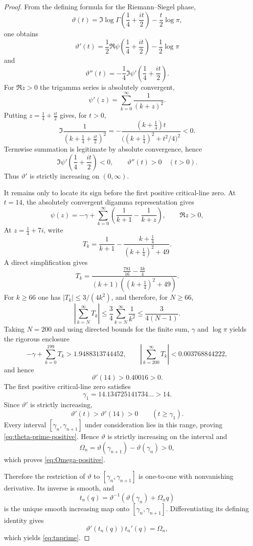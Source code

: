 \documentclass[11pt]{amsart}
\numberwithin{equation}{section}
\begin{document}
\begin{proof}
From the defining formula for the Riemann--Siegel phase,
\[
\vartheta(t)
=\Im\log\Gamma\!\left(\frac14+\frac{it}{2}\right)
-\frac t2\log\pi,
\]
one obtains
\begin{equation}
\vartheta'(t)
=\frac12\Re\psi\!\left(\frac14+\frac{it}{2}\right)
-\frac12\log\pi
\label{eq:theta-digamma}
\end{equation}
and
\begin{equation}
\vartheta''(t)
=-\frac14\Im\psi'\!\left(\frac14+\frac{it}{2}\right).
\label{eq:theta-trigamma}
\end{equation}
For $\Re z>0$ the trigamma series is absolutely convergent,
\[
\psi'(z)=\sum_{k=0}^{\infty}\frac1{(k+z)^2}.
\]
Putting $z=\frac14+\frac{it}{2}$ gives, for $t>0$,
\[
\Im\frac1{(k+\frac14+\frac{it}{2})^2}
=
-\frac{(k+\frac14)t}
{\bigl((k+\frac14)^2+t^2/4\bigr)^2}<0.
\]
Termwise summation is legitimate by absolute convergence, hence
\[
\Im\psi'\!\left(\frac14+\frac{it}{2}\right)<0,
\qquad
\boxed{\vartheta''(t)>0\quad(t>0).}
\]
Thus $\vartheta'$ is strictly increasing on $(0,\infty)$.

It remains only to locate its sign before the first positive critical-line zero.  At $t=14$, the absolutely convergent digamma representation gives
\[
\psi(z)=-\gamma+\sum_{k=0}^{\infty}
\left(\frac1{k+1}-\frac1{k+z}\right),
\qquad \Re z>0,
\]
At $z=\frac14+7i$, write
\[
T_k=\frac1{k+1}-\frac{k+\frac14}{(k+\frac14)^2+49}.
\]
A direct simplification gives
\[
T_k=
\frac{\frac{781}{16}-\frac{3k}{4}}
{(k+1)((k+\frac14)^2+49)}.
\]
For $k\ge66$ one has $|T_k|\le3/(4k^2)$, and therefore, for
$N\ge66$,
\[
\left|\sum_{k=N}^{\infty}T_k\right|
\le\frac34\sum_{k=N}^{\infty}\frac1{k^2}
\le\frac{3}{4(N-1)}.
\]
Taking $N=200$ and using directed bounds for the finite sum, $\gamma$
and $\log\pi$ yields the rigorous enclosure
\[
-\gamma+\sum_{k=0}^{199}T_k>1.9488313744452,
\qquad
\left|\sum_{k=200}^{\infty}T_k\right|<0.003768844222,
\]
and hence
\[
\boxed{\vartheta'(14)>0.40016>0.}
\]
The first positive critical-line zero satisfies
\[
\gamma_1=14.134725141734\ldots>14.
\]
Since $\vartheta'$ is strictly increasing,
\[
\vartheta'(t)>\vartheta'(14)>0
\qquad(t\ge\gamma_1).
\]
Every interval $[\gamma_n,\gamma_{n+1}]$ under consideration lies in this range, proving \eqref{eq:theta-prime-positive}.  Hence $\vartheta$ is strictly increasing on the interval and
\[
\Omega_n
=\vartheta(\gamma_{n+1})-\vartheta(\gamma_n)>0,
\]
which proves \eqref{eq:Omega-positive}.

Therefore the restriction of $\vartheta$ to $[\gamma_n,\gamma_{n+1}]$ is one-to-one with nonvanishing derivative.  Its inverse is smooth, and
\[
t_n(q)
=\vartheta^{-1}\!\left(\vartheta(\gamma_n)+\Omega_nq\right)
\]
is the unique smooth increasing map onto $[\gamma_n,\gamma_{n+1}]$.  Differentiating its defining identity gives
\[
\vartheta'(t_n(q))t_n'(q)=\Omega_n,
\]
which yields \eqref{eq:tnprime}.
\end{proof}
\end{document}

